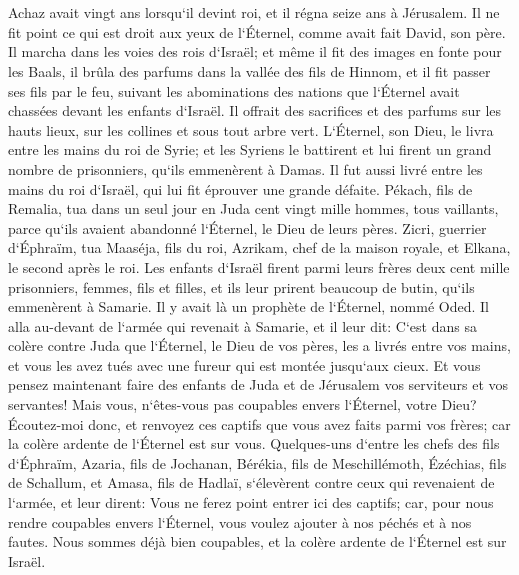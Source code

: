 \chapter{}

\verse Achaz avait vingt ans lorsqu`il devint roi, et il régna seize ans à Jérusalem. Il ne fit point ce qui est droit aux yeux de l`Éternel, comme avait fait David, son père. 
\verse Il marcha dans les voies des rois d`Israël; et même il fit des images en fonte pour les Baals, 
\verse il brûla des parfums dans la vallée des fils de Hinnom, et il fit passer ses fils par le feu, suivant les abominations des nations que l`Éternel avait chassées devant les enfants d`Israël. 
\verse Il offrait des sacrifices et des parfums sur les hauts lieux, sur les collines et sous tout arbre vert. 
\verse L`Éternel, son Dieu, le livra entre les mains du roi de Syrie; et les Syriens le battirent et lui firent un grand nombre de prisonniers, qu`ils emmenèrent à Damas. Il fut aussi livré entre les mains du roi d`Israël, qui lui fit éprouver une grande défaite. 
\verse Pékach, fils de Remalia, tua dans un seul jour en Juda cent vingt mille hommes, tous vaillants, parce qu`ils avaient abandonné l`Éternel, le Dieu de leurs pères. 
\verse Zicri, guerrier d`Éphraïm, tua Maaséja, fils du roi, Azrikam, chef de la maison royale, et Elkana, le second après le roi. 
\verse Les enfants d`Israël firent parmi leurs frères deux cent mille prisonniers, femmes, fils et filles, et ils leur prirent beaucoup de butin, qu`ils emmenèrent à Samarie. 
\verse Il y avait là un prophète de l`Éternel, nommé Oded. Il alla au-devant de l`armée qui revenait à Samarie, et il leur dit: C`est dans sa colère contre Juda que l`Éternel, le Dieu de vos pères, les a livrés entre vos mains, et vous les avez tués avec une fureur qui est montée jusqu`aux cieux. 
\verse Et vous pensez maintenant faire des enfants de Juda et de Jérusalem vos serviteurs et vos servantes! Mais vous, n`êtes-vous pas coupables envers l`Éternel, votre Dieu? 
\verse Écoutez-moi donc, et renvoyez ces captifs que vous avez faits parmi vos frères; car la colère ardente de l`Éternel est sur vous. 
\verse Quelques-uns d`entre les chefs des fils d`Éphraïm, Azaria, fils de Jochanan, Bérékia, fils de Meschillémoth, Ézéchias, fils de Schallum, et Amasa, fils de Hadlaï, s`élevèrent contre ceux qui revenaient de l`armée, 
\verse et leur dirent: Vous ne ferez point entrer ici des captifs; car, pour nous rendre coupables envers l`Éternel, vous voulez ajouter à nos péchés et à nos fautes. Nous sommes déjà bien coupables, et la colère ardente de l`Éternel est sur Israël. 
